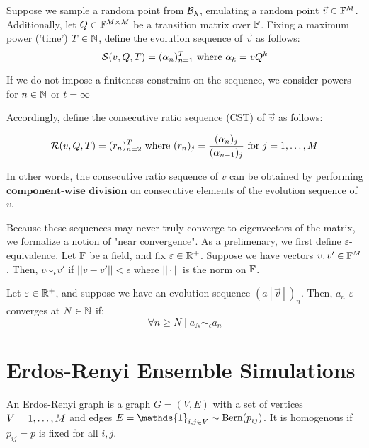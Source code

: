 \begin{definition}
Suppose we sample a random point from $\B_\lambda$, emulating a random point $\vec{v} \in \F^M$. Additionally, let $Q \in \F^{M \times M}$ be a transition matrix over $\F$. Fixing a maximum power ('time') $T \in \N$, define the evolution sequence of $\vec{v}$ as follows:
$$\Seq(v, Q, T) = (\alpha_n)_{n=1}^T \text{ where } \alpha_k = {v}Q^k$$

If we do not impose a finiteness constraint on the sequence, we consider powers for $n \in \N$ or $t = \infty$
\end{definition}


\begin{definition}

Accordingly, define the consecutive ratio sequence (CST) of $\vec{v}$ as follows:

$$\Rseq(v, Q, T) = (r_n)_{n=2}^T \text{ where } (r_n)_j = \frac{(\alpha_n)_j}{(\alpha_{n-1})_j} \text{ for } j = \oneto[M]$$

In other words, the consecutive ratio sequence of $v$ can be obtained by performing $\textbf{component-wise division}$ on consecutive elements of the evolution sequence of $v$.
\end{definition}

\begin{definition}

Because these sequences may never truly converge to eigenvectors of the matrix, we formalize a notion of "near convergence". As a prelimenary, we first define $\varepsilon$-equivalence. Let $\F$ be a field, and fix $\varepsilon \in \R^+$. Suppose we have vectors $v, v' \in \F^M$. Then, $v \sim_\epsilon v'$ if $||v - v'|| < \epsilon$ where $|| \cdot ||$ is the norm on $\F$.
\end{definition}

Let $\varepsilon \in \R^+$, and suppose we have an evolution sequence $(a[\vec{v}])_n$. Then, $a_n$ $\varepsilon$-converges at $N \in \N$ if:
$$\forall n \geq N \mid  a_N \sim_\epsilon a_n$$


\section{Erdos-Renyi Ensemble Simulations}

\begin{definition}
An Erdos-Renyi graph is a graph $G = (V,E)$ with a set of vertices $V = \oneto[M]$ and edges $E = \mathds{1}_{i,j \in V} \sim \Bern(p_{ij})$. It is homogenous if $p_{ij} = p$ is fixed for all $i, j$.
\end{definition}

